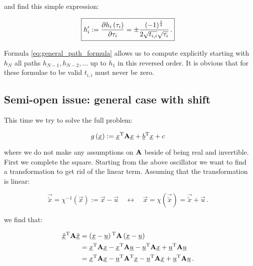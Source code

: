 \documentclass[a4paper,10pt]{article}
\begin{document}
and find this simple expression:

\begin{equation} \label{eq:general_path_derivative_formula}
\boxed{
  h_i^{\prime} := \frac{\partial h_i\left(\tau_i\right)}{\partial \tau_i}
  = \pm \frac{(-1)^{\frac{1}{4}}}{2 \sqrt{t_{i,i}}\sqrt{\tau_i}} \,.
}
\end{equation}

Formula \eqref{eq:general_path_formula} allows us to compute explicitly
starting with $h_N$ all paths $h_{N-1}, h_{N-2}, \ldots$ up to $h_1$
in this reversed order. It is obvious that for these formulae to be valid
$t_{i,i}$ must never be zero.


\subsection{Semi-open issue: general case with shift}

This time we try to solve the full problem:

\begin{equation}
  g\left(\underline{x}\right) := \underline{x}{}^{\textnormal{T}} \mathbf{A} \underline{x} + \underline{b}{}^{\textnormal{T}} \underline{x} + c
\end{equation}


where we do not make any assumptions on $\mathbf{A}$ beside of being real and invertible.
First we complete the square. Starting from the above oscillator we want to find
a transformation to get rid of the linear term. Assuming that the transformation
is linear:

\begin{equation}
 \vec{\tilde{x}} = \chi^{-1}\left(\vec{x}\right) := \vec{x} - \vec{u}
 \quad \leftrightarrow \quad
 \vec{x} = \chi\left(\vec{\tilde{x}}\right) = \vec{\tilde{x}} + \vec{u} \,.
\end{equation}

we find that:

\begin{equation}
\begin{split}
  \underline{\tilde{x}}{}^{\textnormal{T}} \mathbf{A} \underline{\tilde{x}}
  & = \left(\underline{x}-\underline{u}\right){}^{\textnormal{T}} \mathbf{A} \left(\underline{x}-\underline{u}\right) \\
  & = \underline{x}{}^{\textnormal{T}} \mathbf{A} \underline{x} - \underline{x}{}^{\textnormal{T}} \mathbf{A} \underline{u} -
      \underline{u}{}^{\textnormal{T}} \mathbf{A} \underline{x} + \underline{u}{}^{\textnormal{T}} \mathbf{A} \underline{u} \\
  & = \underline{x}{}^{\textnormal{T}} \mathbf{A} \underline{x} - \underline{u}{}^{\textnormal{T}} \mathbf{A}{}^{\textnormal{T}} \underline{x} -
      \underline{u}{}^{\textnormal{T}} \mathbf{A} \underline{x} + \underline{u}{}^{\textnormal{T}} \mathbf{A} \underline{u} \,.
\end{split}
\end{equation}
\end{document}
